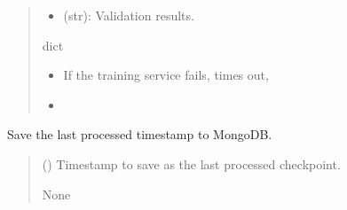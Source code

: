 \documentclass[letterpaper,10pt,english]{sphinxmanual}
\begin{document}
\begin{fulllineitems}
\begin{quote}
\begin{description}
\begin{description}
\begin{itemize}
\item {} 
\sphinxAtStartPar
{} (str): Validation results.

\end{itemize}

\end{description}


\sphinxAtStartPar
dict

\begin{itemize}
\item {} 
\sphinxAtStartPar
{} \textendash{} If the training service fails, times out,

\item {} 
\sphinxAtStartPar
{} \textendash{} 

\end{itemize}

\end{description}\end{quote}

\end{fulllineitems}


\begin{fulllineitems}
\label{\detokenize{modules/src.pig_sorting_api.main:src.pig_sorting_api.main.save_checkpoint}}
\pysigstartsignatures
\pysiglinewithargsret
{}
{}
{}
\pysigstopsignatures
\sphinxAtStartPar
Save the last processed timestamp to MongoDB.
\begin{quote}\begin{description}
\sphinxAtStartPar
{} ({\hyperref[\detokenize{modules/src.pig_sorting_api.main:src.pig_sorting_api.main.datetime}]{}}) \textendash{} Timestamp to save as the last processed checkpoint.

\sphinxAtStartPar
None

\end{description}\end{quote}

\end{fulllineitems}
\end{document}
